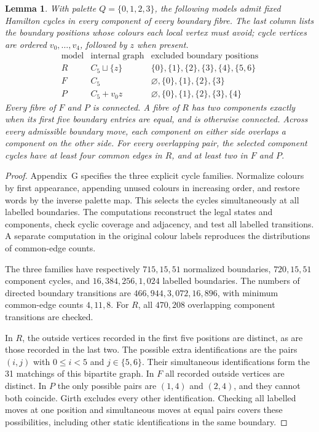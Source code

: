 \documentclass[11pt]{article}
\newtheorem{lemma}[theorem]{Lemma}
\theoremstyle{remark}
\numberwithin{equation}{section}
\numberwithin{table}{section}
\begin{document}
\begin{lemma}\label{lem:pentagonal-reservoir-data}
With palette $Q=\{0,1,2,3\}$, the following models admit fixed Hamilton
cycles in every component of every boundary fibre. The last column lists
the boundary positions whose colours each local vertex must avoid;
cycle vertices are ordered $v_0,\ldots,v_4$, followed by $z$ when present.
\[
\begin{array}{c|c|l}
\text{model}&\text{internal graph}&\text{excluded boundary positions}\\ \hline
R&C_5\sqcup\{z\}&\{0\},\{1\},\{2\},\{3\},\{4\},\{5,6\}\\
F&C_5&\varnothing,\{0\},\{1\},\{2\},\{3\}\\
P&C_5+v_0z&\varnothing,\{0\},\{1\},\{2\},\{3\},\{4\}
\end{array}
\]
Every fibre of $F$ and $P$ is connected. A fibre of $R$ has two components
exactly when its first five boundary entries are equal, and is otherwise
connected. Across every admissible boundary move, each component
on either side overlaps a component on the other side. For every overlapping
pair, the selected component cycles have at least four common edges in
$R$, and at least two in $F$ and $P$.
\end{lemma}
\begin{proof}
Appendix~G specifies the three explicit cycle families.
Normalize colours by first appearance, appending unused colours in
increasing order, and restore words by the inverse palette map. This selects
the cycles simultaneously at all labelled boundaries. The computations
reconstruct the legal states and components, check cyclic coverage and
adjacency, and test all labelled transitions. A separate computation in the original colour labels reproduces the distributions of common-edge counts.

The three families have respectively $715,15,51$ normalized boundaries,
$720,15,51$ component cycles, and $16{,}384,256,1{,}024$ labelled boundaries.
The numbers of directed boundary transitions are
$466{,}944,3{,}072,16{,}896$, with minimum common-edge counts $4,11,8$.
For $R$, all $470{,}208$ overlapping component transitions are checked.

In $R$, the outside vertices recorded in the first five positions are
distinct, as are those recorded in the last two. The possible
extra identifications are the pairs $(i,j)$ with $0\le i<5$ and
$j\in\{5,6\}$. Their simultaneous identifications form the 31 matchings
of this bipartite graph. In $F$ all recorded outside vertices are distinct. In $P$ the only
possible pairs are $(1,4)$ and $(2,4)$, and they cannot both coincide.
Girth excludes every other identification. Checking all labelled moves at one position
and simultaneous moves at equal pairs covers these possibilities, including
other static identifications in the same boundary.
\end{proof}
\end{document}
